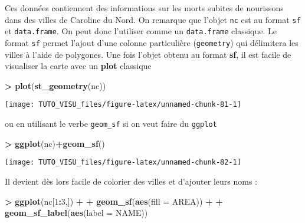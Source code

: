 \documentclass[]{book}
\newenvironment{Shaded}{\begin{snugshade}}{\end{snugshade}}
\newcommand{\DataTypeTok}[1]{\textcolor[rgb]{0.13,0.29,0.53}{#1}}
\newcommand{\DecValTok}[1]{\textcolor[rgb]{0.00,0.00,0.81}{#1}}
\newcommand{\KeywordTok}[1]{\textcolor[rgb]{0.13,0.29,0.53}{\textbf{#1}}}
\newcommand{\NormalTok}[1]{#1}
\newcommand{\OperatorTok}[1]{\textcolor[rgb]{0.81,0.36,0.00}{\textbf{#1}}}
\newcommand{\StringTok}[1]{\textcolor[rgb]{0.31,0.60,0.02}{#1}}
\theoremstyle{definition}
\theoremstyle{definition}
\theoremstyle{definition}
\theoremstyle{remark}
\begin{document}
Ces données contiennent des informations sur les morts subites de nourissons dans des villes de Caroline du Nord. On remarque que l'objet \texttt{nc} est au format \texttt{sf} et \texttt{data.frame}. On peut donc l'utiliser comme un \texttt{data.frame} classique. Le format \texttt{sf} permet l'ajout d'une colonne particulière (\texttt{geometry}) qui délimitera les villes à l'aide de polygones. Une fois l'objet obtenu au format \textbf{sf}, il est facile de visualiser la carte avec un \textbf{plot} classique

\begin{Shaded}
\begin{Highlighting}[]
\OperatorTok{>}\StringTok{ }\KeywordTok{plot}\NormalTok{(}\KeywordTok{st_geometry}\NormalTok{(nc))}
\end{Highlighting}
\end{Shaded}

\begin{center}\texttt{[image: TUTO\_VISU\_files/figure-latex/unnamed-chunk-81-1]} \end{center}

ou en utilisant le verbe \texttt{geom\_sf} si on veut faire du \texttt{ggplot}

\begin{Shaded}
\begin{Highlighting}[]
\OperatorTok{>}\StringTok{ }\KeywordTok{ggplot}\NormalTok{(nc)}\OperatorTok{+}\KeywordTok{geom_sf}\NormalTok{()}
\end{Highlighting}
\end{Shaded}

\begin{center}\texttt{[image: TUTO\_VISU\_files/figure-latex/unnamed-chunk-82-1]} \end{center}

Il devient dès lors facile de colorier des villes et d'ajouter leurs noms :

\begin{Shaded}
\begin{Highlighting}[]
\OperatorTok{>}\StringTok{ }\KeywordTok{ggplot}\NormalTok{(nc[}\DecValTok{1}\OperatorTok{:}\DecValTok{3}\NormalTok{,]) }\OperatorTok{+}
\OperatorTok{+}\StringTok{    }\KeywordTok{geom_sf}\NormalTok{(}\KeywordTok{aes}\NormalTok{(}\DataTypeTok{fill =}\NormalTok{ AREA)) }\OperatorTok{+}\StringTok{ }
\OperatorTok{+}\StringTok{    }\KeywordTok{geom_sf_label}\NormalTok{(}\KeywordTok{aes}\NormalTok{(}\DataTypeTok{label =}\NormalTok{ NAME))}
\end{Highlighting}
\end{Shaded}
\end{document}
